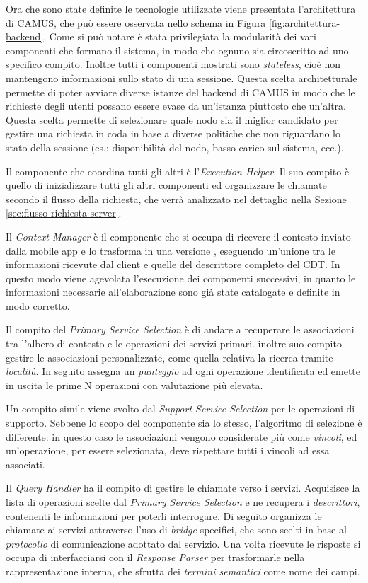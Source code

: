 Ora che sono state definite le tecnologie utilizzate viene presentata l'architettura di CAMUS, che può essere osservata nello schema in Figura \ref{fig:architettura-backend}. Come si può notare è stata privilegiata la modularità dei vari componenti che formano il sistema, in modo che ognuno sia circoscritto ad uno specifico compito. Inoltre tutti i componenti mostrati sono \emph{stateless}, cioè non mantengono informazioni sullo stato di una sessione. Questa scelta architetturale permette di poter avviare diverse istanze del backend di CAMUS in modo che le richieste degli utenti possano essere evase da un'istanza piuttosto che un'altra. Questa scelta permette di selezionare quale nodo sia il miglior candidato per gestire una richiesta in coda in base a diverse politiche che non riguardano lo stato della sessione (es.: disponibilità del nodo, basso carico sul sistema, ecc.).

Il componente che coordina tutti gli altri è l'\emph{Execution Helper}. Il suo compito è quello di inizializzare tutti gli altri componenti ed organizzare le chiamate secondo il flusso della richiesta, che verrà analizzato nel dettaglio nella Sezione \ref{sec:flusso-richiesta-server}.

Il \emph{Context Manager} è il componente che si occupa di ricevere il contesto inviato dalla mobile app e lo trasforma in una versione , eseguendo un'unione tra le informazioni ricevute dal client e quelle del descrittore completo del CDT. In questo modo viene agevolata l'esecuzione dei componenti successivi, in quanto le informazioni necessarie all'elaborazione sono già state catalogate e definite in modo corretto.

Il compito del \emph{Primary Service Selection} è di andare a recuperare le associazioni tra l'albero di contesto e le operazioni dei servizi primari. \upe inoltre suo compito gestire le associazioni personalizzate, come quella relativa la ricerca tramite \emph{località}. In seguito assegna un \emph{punteggio} ad ogni operazione identificata ed emette in uscita le prime N operazioni con valutazione più elevata.

Un compito simile viene svolto dal \emph{Support Service Selection} per le operazioni di supporto. Sebbene lo scopo del componente sia lo stesso, l'algoritmo di selezione è differente: in questo caso le associazioni vengono considerate più come \emph{vincoli}, ed un'operazione, per essere selezionata, deve rispettare tutti i vincoli ad essa associati.

Il \emph{Query Handler} ha il compito di gestire le chiamate verso i servizi. Acquisisce la lista di operazioni scelte dal \emph{Primary Service Selection} e ne recupera i \emph{descrittori}, contenenti le informazioni per poterli interrogare. Di seguito organizza le chiamate ai servizi attraverso l'uso di \emph{bridge} specifici, che sono scelti in base al \emph{protocollo} di comunicazione adottato dal servizio. Una volta ricevute le risposte si occupa di interfacciarsi con il \emph{Response Parser} per trasformarle nella rappresentazione interna, che sfrutta dei \emph{termini semantici} come nome dei campi.

